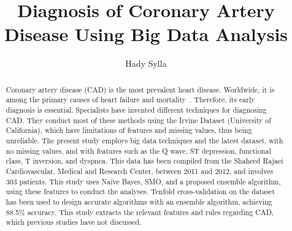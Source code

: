 
\def\paperstatus{100} %
\def\paperchapter{Application} %
\def\hid{hid-sp18-706} %
\def\volume{9} %

\def\locator{\hid, Volume: \volume, Chapter: \paperchapter, Status: \paperstatus. \newline}


\title{Diagnosis of Coronary Artery Disease Using Big Data Analysis}

\author{Hady Sylla}



\begin{abstract}
  Coronary artery disease (CAD) is the most prevalent heart disease.
  Worldwide, it is among the primary causes of heart failure and
  mortality~\cite{ali}. Therefore, its early diagnosis is essential.
  Specialists have invented different techniques for diagnosing CAD.
  They conduct most of these methods using the Irvine Dataset
  (University of California), which have limitations of features and
  missing values, thus being unreliable. The present study employs big
  data techniques and the latest dataset, with no missing values, and
  with features such as the Q wave, ST depression, functional class, T
  inversion, and dyspnea. This data has been compiled from the Shaheed
  Rajaei Cardiovascular, Medical and Research Center, between 2011 and
  2012, and involves 303 patients. This study uses Naïve Bayes, SMO,
  and a proposed ensemble algorithm, using these features to conduct
  the analyses. Tenfold cross-validation on the dataset has been used
  to design accurate algorithms with an ensemble algorithm, achieving
  88.5\% accuracy. This study extracts the relevant features and rules
  regarding CAD, which previous studies have not discussed.

\end{abstract}

